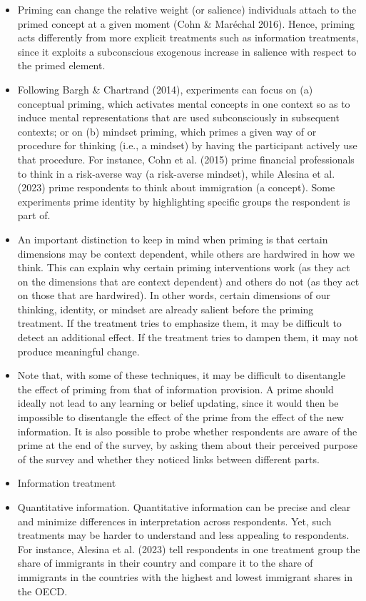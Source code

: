 \documentclass[a4paper, 12pt]{article}
\begin{document}
\begin{itemize}
\begin{itemize}
        \item Priming can change the relative weight (or salience) individuals attach to the primed concept at a given moment (Cohn \& Maréchal 2016). Hence, priming acts differently from more explicit treatments such as information treatments, since it exploits a subconscious exogenous increase in salience with respect to the primed element.
        \item Following Bargh \& Chartrand (2014), experiments can focus on (a) conceptual priming, which activates mental concepts in one context so as to induce mental representations that are used subconsciously in subsequent contexts; or on (b) mindset priming, which primes a given way of or procedure for thinking (i.e., a mindset) by having the participant actively use that procedure. For instance, Cohn et al. (2015) prime financial professionals to think in a risk-averse way (a risk-averse mindset), while Alesina et al. (2023) prime respondents to think about immigration (a concept). Some experiments prime identity by highlighting specific groups the respondent is part of.
        \item An important distinction to keep in mind when priming is that certain dimensions may be context dependent, while others are hardwired in how we think. This can explain why certain priming interventions work (as they act on the dimensions that are context dependent) and others do not (as they act on those that are hardwired). In other words, certain dimensions of our thinking, identity, or mindset are already salient before the priming treatment. If the treatment tries to emphasize them, it may be difficult to detect an additional effect. If the treatment tries to dampen them, it may not produce meaningful change.
        \item Note that, with some of these techniques, it may be difficult to disentangle the effect of priming from that of information provision. A prime should ideally not lead to any learning or belief updating, since it would then be impossible to disentangle the effect of the prime from the effect of the new information. It is also possible to probe whether respondents are aware of the prime at the end of the survey, by asking them about their perceived purpose of the survey and whether they noticed links between different parts.
        \item Information treatment
        \item Quantitative information. Quantitative information can be precise and clear and minimize differences in interpretation across respondents. Yet, such treatments may be harder to understand and less appealing to respondents. For instance, Alesina et al. (2023) tell respondents in one treatment group the share of immigrants in their country and compare it to the share of immigrants in the countries with the highest and lowest immigrant shares in the OECD.

\end{itemize}
\end{itemize}
\end{document}
